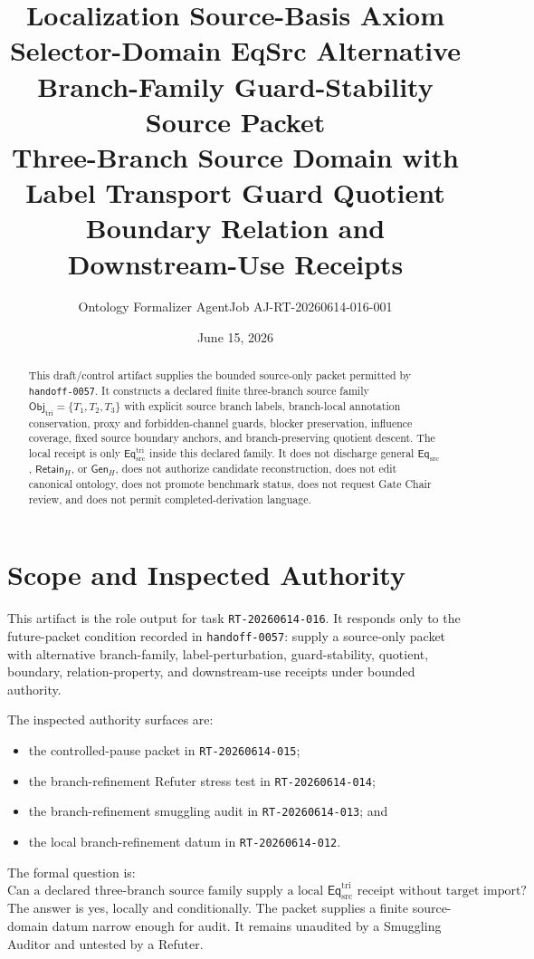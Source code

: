 \documentclass[11pt]{article}
\title{\textbf{Localization Source-Basis Axiom Selector-Domain EqSrc Alternative Branch-Family Guard-Stability Source Packet}\\[0.35em]
\large Three-Branch Source Domain with Label Transport Guard Quotient Boundary Relation and Downstream-Use Receipts}
\author{Ontology Formalizer AgentJob AJ-RT-20260614-016-001}
\date{June 15, 2026}
\newcommand{\EqSrc}{\mathsf{Eq}_{\mathrm{src}}}
\newcommand{\EqTri}{\mathsf{Eq}_{\mathrm{src}}^{\mathrm{tri}}}
\newcommand{\ObjTri}{\mathsf{Obj}_{\mathrm{tri}}}
\newcommand{\RetainH}{\mathsf{Retain}_{H}}
\newcommand{\GenH}{\mathsf{Gen}_{H}}
\begin{document}
\maketitle

\begin{abstract}
This draft/control artifact supplies the bounded source-only packet
permitted by \texttt{handoff-0057}. It constructs a declared finite
three-branch source family
\(\ObjTri=\{T_{1},T_{2},T_{3}\}\) with explicit source branch labels,
branch-local annotation conservation, proxy and forbidden-channel guards,
blocker preservation, influence coverage, fixed source boundary anchors,
and branch-preserving quotient descent. The local receipt is only
\(\EqTri\) inside this declared family. It does not discharge general
\(\EqSrc\), \(\RetainH\), or \(\GenH\), does not authorize candidate
reconstruction, does not edit canonical ontology, does not promote
benchmark status, does not request Gate Chair review, and does not permit
completed-derivation language.
\end{abstract}

\section{Scope and Inspected Authority}

This artifact is the role output for task \texttt{RT-20260614-016}. It
responds only to the future-packet condition recorded in
\texttt{handoff-0057}: supply a source-only packet with alternative
branch-family, label-perturbation, guard-stability, quotient, boundary,
relation-property, and downstream-use receipts under bounded authority.

The inspected authority surfaces are:
\begin{itemize}
    \item the controlled-pause packet in \texttt{RT-20260614-015};
    \item the branch-refinement Refuter stress test in
    \texttt{RT-20260614-014};
    \item the branch-refinement smuggling audit in
    \texttt{RT-20260614-013}; and
    \item the local branch-refinement datum in \texttt{RT-20260614-012}.
\end{itemize}

The formal question is:
\[
    \text{Can a declared three-branch source family supply a local }
    \EqTri\text{ receipt without target import?}
\]
The answer is yes, locally and conditionally. The packet supplies a
finite source-domain datum narrow enough for audit. It remains unaudited
by a Smuggling Auditor and untested by a Refuter.
\end{document}
